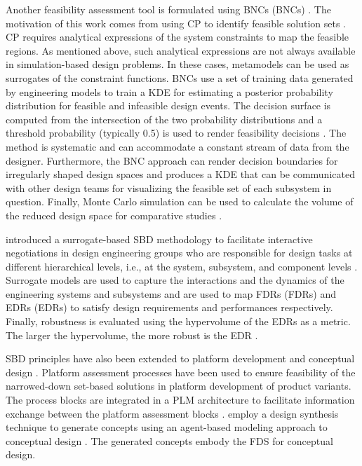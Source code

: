 Another feasibility assessment tool is formulated using \aclp{BNC} (\acsp{BNC}) \cite{Shahan2012,Backlund2015,Rosen2015a}. The motivation of this work comes from using \ac{CP} to identify feasible solution sets \cite{Yannou2003}. \Ac{CP} requires analytical expressions of the system constraints to map the feasible regions. As mentioned above, such analytical expressions are not always available in simulation-based design problems. In these cases, metamodels can be used as surrogates of the constraint functions. \acp{BNC} use a set of training data generated by engineering models to train a \ac{KDE} for estimating a posterior probability distribution for feasible and infeasible design events. The decision surface is computed from the intersection of the two probability distributions and a threshold probability (typically 0.5) is used to render feasibility decisions \cite{Shahan2012}. The method is systematic and can accommodate a constant stream of data from the designer. Furthermore, the \ac{BNC} approach can render decision boundaries for irregularly shaped design spaces and produces a \ac{KDE} that can be communicated with other design teams for visualizing the feasible set of each subsystem in question. Finally, Monte Carlo simulation can be used to calculate the volume of the reduced design space for comparative studies \cite{Yannou2003}.

\citeauthor{Ge2005} introduced a surrogate-based \ac{SBD} methodology to facilitate interactive negotiations in design engineering groups who are responsible for design tasks at different hierarchical levels, i.e., at the system, subsystem, and component levels \cite{Ge2005}. Surrogate models are used to capture the interactions and the dynamics of the engineering systems and subsystems and are used to map \aclp{FDR} (\acsp{FDR}) and \aclp{EDR} (\acsp{EDR}) to satisfy design requirements and performances respectively. Finally, robustness is evaluated using the hypervolume of the \acp{EDR} as a metric. The larger the hypervolume, the more robust is the \ac{EDR} \cite{Taguchi1987}.

\ac{SBD} principles have also been extended to platform development \cite{Landahl2016,Suh2007} and conceptual design \cite{Jiachuan2003}. Platform assessment processes have been used to ensure feasibility of the narrowed-down set-based solutions in platform development of product variants. The process blocks are integrated in a \ac{PLM} architecture to facilitate information exchange between the platform assessment blocks \cite{Landahl2016}. \citeauthor{Jiachuan2003} employ a design synthesis technique to generate concepts using an agent-based modeling approach to conceptual design \cite{Jiachuan2003}. The generated concepts embody the \ac{FDS} for conceptual design.

